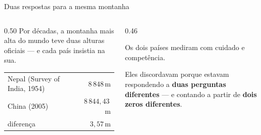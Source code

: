 \documentclass[aspectratio=169,11pt]{beamer}
\newcommand{\bnum}[1]{\textbf{\textcolor{mTeal}{#1}}}
\begin{document}
\begin{frame}{Duas respostas para a mesma montanha}
  \begin{columns}[T]
    \begin{column}{0.50\textwidth}
      Por décadas, a montanha mais alta do mundo teve \alert{duas alturas oficiais} ---
      e cada país insistia na sua.
      \medskip
      \centering
      \small
      \renewcommand{\arraystretch}{1.35}
      \begin{tabular}{lr}
        \toprule
        Nepal (Survey of India, 1954) & $8\,848$\,m \\
        China (2005) & $8\,844{,}43$\,m \\
        \midrule
        diferença & \alert{$3{,}57$\,m} \\
        \bottomrule
      \end{tabular}
    \end{column}
    \begin{column}{0.46\textwidth}
      \begin{cuidado}[title={Não era teimosia}]
        Os dois países mediram com cuidado e competência.
        \medskip

        Eles discordavam porque estavam respondendo a \bnum{duas perguntas diferentes} ---
        e contando a partir de \bnum{dois zeros diferentes}.
      \end{cuidado}
    \end{column}
  \end{columns}
\end{frame}
\end{document}
